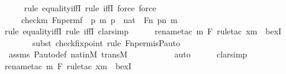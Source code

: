 \begin{isabellebody}
\ \ \ \ \isamarkupfalse%
{\isacharparenleft}{\kern0pt}rule\ equality{\isacharunderscore}{\kern0pt}iffI{\isacharcomma}{\kern0pt}\ rule\ iffI{\isacharcomma}{\kern0pt}\ force{\isacharcomma}{\kern0pt}\ force{\isacharparenright}{\kern0pt}\ \isanewline
\ \ \isamarkupfalse%
\ \isamarkupfalse%
\ {\isachardoublequoteopen}{\isachardot}{\kern0pt}{\isachardot}{\kern0pt}{\isachardot}{\kern0pt}\ {\isacharequal}{\kern0pt}\ {\isacharbraceleft}{\kern0pt}\ {\isacharless}{\kern0pt}check{\isacharparenleft}{\kern0pt}m{\isacharparenright}{\kern0pt}{\isacharcomma}{\kern0pt}\ Fn{\isacharunderscore}{\kern0pt}perm{\isacharprime}{\kern0pt}{\isacharparenleft}{\kern0pt}f{\isacharparenright}{\kern0pt}\ {\isacharbackquote}{\kern0pt}\ p{\isachargreater}{\kern0pt}{\isachardot}{\kern0pt}{\isachardot}{\kern0pt}\ {\isacharless}{\kern0pt}m{\isacharcomma}{\kern0pt}\ p{\isachargreater}{\kern0pt}\ {\isasymin}\ nat\ {\isasymtimes}\ Fn{\isacharcomma}{\kern0pt}\ p{\isacharbackquote}{\kern0pt}{\isacharless}{\kern0pt}n{\isacharcomma}{\kern0pt}\ m{\isachargreater}{\kern0pt}\ {\isacharequal}{\kern0pt}\ {}\ {\isacharbraceright}{\kern0pt}{\isachardoublequoteclose}\ \isanewline
\ \ \ \ \isamarkupfalse%
{\isacharparenleft}{\kern0pt}rule\ equality{\isacharunderscore}{\kern0pt}iffI{\isacharcomma}{\kern0pt}\ rule\ iffI{\isacharcomma}{\kern0pt}\ clarsimp{\isacharparenright}{\kern0pt}\isanewline
\ \ \ \ \ \isamarkupfalse%
{\isacharparenleft}{\kern0pt}rename{\isacharunderscore}{\kern0pt}tac\ m\ F{\isacharcomma}{\kern0pt}\ rule{\isacharunderscore}{\kern0pt}tac\ x{\isacharequal}{\kern0pt}m\ \ bexI{\isacharparenright}{\kern0pt}\isanewline
\ \ \ \ \ \ \isamarkupfalse%
{\isacharparenleft}{\kern0pt}subst\ check{\isacharunderscore}{\kern0pt}fixpoint{\isacharcomma}{\kern0pt}\ rule\ Fn{\isacharunderscore}{\kern0pt}perm{\isacharprime}{\kern0pt}{\isacharunderscore}{\kern0pt}is{\isacharunderscore}{\kern0pt}P{\isacharunderscore}{\kern0pt}auto{\isacharparenright}{\kern0pt}\isanewline
\ \ \ \ \isamarkupfalse%
\ assms\ P{\isacharunderscore}{\kern0pt}auto{\isacharunderscore}{\kern0pt}def\ nat{\isacharunderscore}{\kern0pt}in{\isacharunderscore}{\kern0pt}M\ transM\ \isanewline
\ \ \ \ \ \ \ \ \isamarkupfalse%
\ auto{\isacharbrackleft}{\kern0pt}{}{\isacharbrackright}{\kern0pt}\isanewline
\ \ \ \ \isamarkupfalse%
\ clarsimp\isanewline
\ \ \ \ \ \isamarkupfalse%
{\isacharparenleft}{\kern0pt}rename{\isacharunderscore}{\kern0pt}tac\ m\ F{\isacharcomma}{\kern0pt}\ rule{\isacharunderscore}{\kern0pt}tac\ x{\isacharequal}{\kern0pt}m\ \ bexI{\isacharparenright}{\kern0pt}\isanewline

\end{isabellebody}
